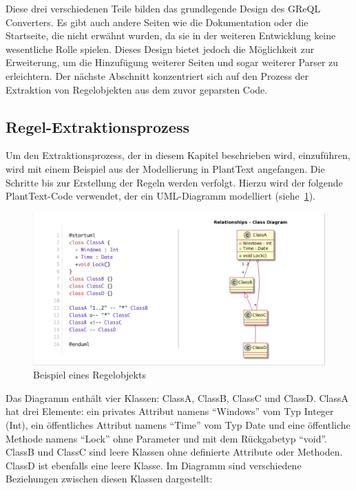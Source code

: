 Diese drei verschiedenen Teile bilden das grundlegende Design des GReQL Converters. Es gibt auch andere Seiten wie die
Dokumentation oder die Startseite, die nicht erwähnt wurden, da sie in der weiteren Entwicklung keine wesentliche Rolle
spielen. Dieses Design bietet jedoch die Möglichkeit zur Erweiterung, um die Hinzufügung weiterer Seiten und sogar
weiterer Parser zu erleichtern. Der nächste Abschnitt konzentriert sich auf den Prozess der Extraktion von Regelobjekten
aus dem zuvor geparsten Code.

\subsection{Regel-Extraktionsprozess}\label{subsec:regel-extraktionsprozess}


Um den Extraktionsprozess, der in diesem Kapitel beschrieben wird, einzuführen, wird mit einem Beispiel aus der
Modellierung in PlantText angefangen. Die Schritte bis zur Erstellung der Regeln werden verfolgt. Hierzu wird der
folgende PlantText-Code verwendet, der ein UML-Diagramm modelliert (siehe~\ref{fig:code-uml}).

\begin{figure}[h]
    \centering
    \includegraphics[width=16cm]{images/code-uml}
    \caption{Beispiel eines Regelobjekts}
    \label{fig:code-uml}
\end{figure}

Das Diagramm enthält vier Klassen: ClassA, ClassB, ClassC und ClassD\@. ClassA hat drei Elemente: ein privates Attribut
namens ``Windows'' vom Typ Integer (Int), ein öffentliches Attribut namens ``Time'' vom Typ Date und eine öffentliche
Methode namens ``Lock'' ohne Parameter und mit dem Rückgabetyp ``void''. ClassB und ClassC sind leere Klassen ohne
definierte Attribute oder Methoden. ClassD ist ebenfalls eine leere Klasse. Im Diagramm sind verschiedene Beziehungen
zwischen diesen Klassen dargestellt:

